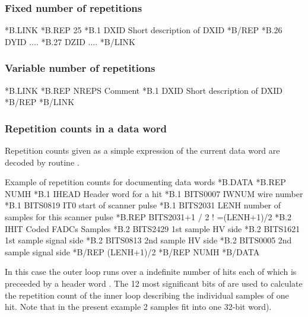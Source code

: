 \subsubsection*{Fixed number of repetitions}
\begin{XMP}
*B.LINK
*B.REP    25
*B.1      DXID     Short description of DXID
*B/REP
*B.26     DYID     ....
*B.27     DZID     ....
*B/LINK
\end{XMP}
\subsubsection*{Variable number of repetitions}
\begin{XMP}
*B.LINK
*B.REP    NREPS    Comment
*B.1      DXID     Short description of DXID
*B/REP
*B/LINK
\end{XMP}
\NODOC{\end{minipage}}
 
\subsubsection*{Repetition counts in a data word}

\NODOC{\begin{minipage}{\textwidth}}
Repetition counts given as a simple expression of the current data
word are decoded by routine .
 
\begin{XMPt}{Example of repetition counts for documenting data words}
*B.DATA
*B.REP  NUMH
*B.1    IHEAD      Header word for a hit
*B.1    BITS0007   IWNUM   wire number
*B.1    BITS0819   IT0     start of scanner pulse
*B.1    BITS2031   LENH    number of samples for this scanner pulse
*B.REP  BITS2031+1 / 2     ! =(LENH+1)/2
*B.2    IHIT       Coded FADCs Samples
*B.2    BITS2429   1st sample HV side
*B.2    BITS1621   1st sample signal side
*B.2    BITS0813   2nd sample HV side
*B.2    BITS0005   2nd sample signal side
*B/REP  (LENH+1)/2
*B/REP  NUMH
*B/DATA
\end{XMPt}
\NODOC{\end{minipage}}

\newpage
 
In this case the outer loop runs over a indefinite number  of
hits each of which is preceeded by a header word .
The 12 most significant bits of 
are used to calculate the repetition count of the inner loop describing
the individual samples of one hit.
Note that in the present example 2 samples fit into one 32-bit word).
 
